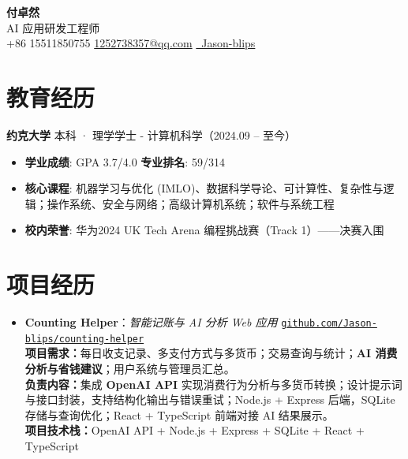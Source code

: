 \documentclass[a4paper]{article}
\begin{document}
\begin{center}
    \Huge \textbf{付卓然} \\[0.3cm]
    \normalsize AI 应用研发工程师 \\
    \small +86 15511850755 \quad \href{mailto:1252738357@qq.com}{1252738357@qq.com} \quad \href{https://github.com/Jason-blips}{\color{githubblue}\faGithub\ Jason-blips}
\end{center}
\vspace{-0.3cm}

\section{教育经历}
\textbf{约克大学} \hfill 本科 · 理学学士 - 计算机科学（2024.09 -- 至今）
\begin{itemize}
    \item \textbf{学业成绩}: GPA 3.7/4.0 \hfill \textbf{专业排名}: 59/314
    \item \textbf{核心课程}: 机器学习与优化 (IMLO)、数据科学导论、可计算性、复杂性与逻辑；操作系统、安全与网络；高级计算机系统；软件与系统工程
    \item \textbf{校内荣誉}: 华为2024 UK Tech Arena 编程挑战赛（Track 1）——决赛入围
\end{itemize}
\vspace{0.2cm}

\section{项目经历}

\begin{itemize}[leftmargin=0pt, itemsep=8pt, label={}]
\item
  \textbf{Counting Helper}：\textit{智能记账与 AI 分析 Web 应用}
  \hfill \href{https://github.com/Jason-blips/counting-helper}{\texttt{github.com/Jason-blips/counting-helper}}\\[2pt]
  \textbf{项目需求：}每日收支记录、多支付方式与多货币；交易查询与统计；\textbf{AI 消费分析与省钱建议}；用户系统与管理员汇总。\\
  \textbf{负责内容：}集成 \textbf{OpenAI API} 实现消费行为分析与多货币转换；设计提示词与接口封装，支持结构化输出与错误重试；Node.js + Express 后端，SQLite 存储与查询优化；React + TypeScript 前端对接 AI 结果展示。\\
  \textbf{项目技术栈：}OpenAI API \;+\; Node.js \;+\; Express \;+\; SQLite \;+\; React \;+\; TypeScript
\end{itemize}
\vspace{0.2cm}
\end{document}
